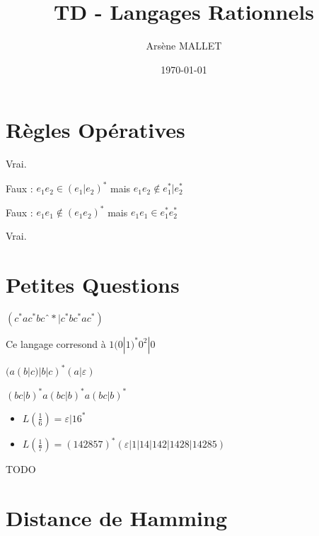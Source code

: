 \documentclass{article}
\title{TD - Langages Rationnels}
\date{\today}
\author{Arsène MALLET}
\begin{document}


\thispagestyle{firstpage}

\begin{center}
    \huge\bfseries{\@title}
\end{center}

\section{Règles Opératives}

\begin{question}
    \item Vrai.

    \item Faux : $e_1e_2 \in (e_1 | e_2)^*$ mais $e_1e_2 \notin e_1^* | e_2^*$

    \item Faux : $e_1e_1 \notin (e_1 e_2)^*$ mais $e_1e_1 \in e_1^* e_2^*$

    \item Vrai.
\end{question}

\section{Petites Questions}

\begin{question}

    \item $(c^*ac^*bcˆ* | c^*bc^*ac^*)$
    \item Ce langage corresond à $1(0|1)^*0^2 | 0$
    \item $(a(b | c) | b | c)^*(a | \varepsilon)$
    \item $(bc | b)^*a(bc | b)^*a(bc | b)^*$
    \item \begin{itemize}
        \item $L(\frac{1}{6}) = \varepsilon | 16^*$
        \item $L(\frac{1}{7}) = (142857)^*(\varepsilon | 1 | 14 | 142 | 1428 | 14285)$
    \end{itemize}
    \item TODO

\end{question}
 
\section{Distance de Hamming}
\end{document}
